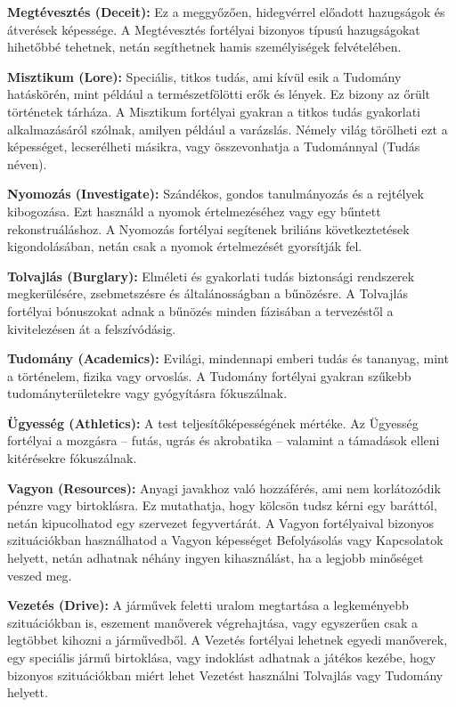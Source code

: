 \textbf{Megtévesztés (Deceit):} Ez a meggyőzően, hidegvérrel előadott hazugságok és átverések képessége. A Megtévesztés fortélyai bizonyos típusú hazugságokat hihetőbbé tehetnek, netán segíthetnek hamis személyiségek felvételében.

\textbf{Misztikum (Lore):} Speciális, titkos tudás, ami kívül esik a Tudomány hatáskörén, mint például a természetfölötti erők és lények. Ez bizony az őrült történetek tárháza. A Misztikum fortélyai gyakran a titkos tudás gyakorlati alkalmazásáról szólnak, amilyen például a varázslás. Némely világ törölheti ezt a képességet, lecserélheti másikra, vagy összevonhatja a Tudománnyal (Tudás néven).

\textbf{Nyomozás (Investigate):} Szándékos, gondos tanulmányozás és a rejtélyek kibogozása. Ezt használd a nyomok értelmezéséhez vagy egy bűntett rekonstruáláshoz. A Nyomozás fortélyai segítenek briliáns következtetések kigondolásában, netán csak a nyomok értelmezését gyorsítják fel.

\textbf{Tolvajlás (Burglary):} Elméleti és gyakorlati tudás biztonsági rendszerek megkerülésére, zsebmetszésre és általánosságban a bűnözésre. A Tolvajlás fortélyai bónuszokat adnak a bűnözés minden fázisában a tervezéstől a kivitelezésen át a felszívódásig.

\textbf{Tudomány (Academics):} Evilági, mindennapi emberi tudás és tananyag, mint a történelem, fizika vagy orvoslás. A Tudomány fortélyai gyakran szűkebb tudományterületekre vagy gyógyításra fókuszálnak.

\textbf{Ügyesség (Athletics):} A test teljesítőképességének mértéke. Az Ügyesség fortélyai a mozgásra – futás, ugrás és akrobatika – valamint a támadások elleni kitérésekre fókuszálnak.

\textbf{Vagyon (Resources):} Anyagi javakhoz való hozzáférés, ami nem korlátozódik pénzre vagy birtoklásra.  Ez mutathatja, hogy kölcsön tudsz kérni egy baráttól, netán kipucolhatod egy szervezet fegyvertárát. A Vagyon fortélyaival bizonyos szituációkban használhatod a Vagyon képességet Befolyásolás vagy Kapcsolatok helyett, netán adhatnak néhány ingyen kihasználást, ha a legjobb minőséget veszed meg.

\textbf{Vezetés (Drive):} A járművek feletti uralom megtartása a legkeményebb szituációkban is, eszement manőverek végrehajtása, vagy egyszerűen csak a legtöbbet kihozni a járművedből. A Vezetés fortélyai lehetnek egyedi manőverek, egy speciális jármű birtoklása, vagy indoklást adhatnak a játékos kezébe, hogy bizonyos szituációkban miért lehet Vezetést használni Tolvajlás vagy Tudomány helyett.
